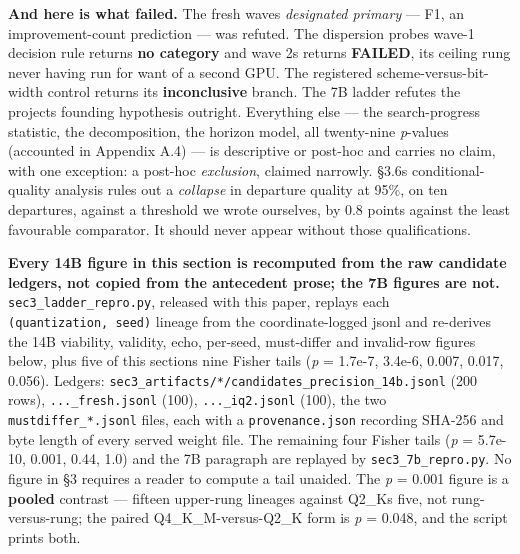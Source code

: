 \textbf{And here is what failed.} The fresh wave\textquotesingle s \emph{designated primary} --- F1, an improvement-count prediction --- was refuted. The dispersion probe\textquotesingle s wave-1 decision rule returns \textbf{no category} and wave 2\textquotesingle s returns \textbf{FAILED}, its ceiling rung never having run for want of a second GPU. The registered scheme-versus-bit-width control returns its \textbf{inconclusive} branch. The 7B ladder refutes the project\textquotesingle s founding hypothesis outright. Everything else --- the search-progress statistic, the decomposition, the horizon model, all twenty-nine \emph{p}-values (accounted in Appendix A.4) --- is descriptive or post-hoc and carries no claim, with one exception: a post-hoc \emph{exclusion}, claimed narrowly. §3.6\textquotesingle s conditional-quality analysis rules out a \emph{collapse} in departure quality at 95\%, on ten departures, against a threshold we wrote ourselves, by 0.8 points against the least favourable comparator. It should never appear without those qualifications.

\textbf{Every 14B figure in this section is recomputed from the raw candidate ledgers, not copied from the antecedent prose; the 7B figures are not.} \texttt{sec3\_ladder\_repro.py}, released with this paper, replays each \texttt{(quantization,\ seed)} lineage from the coordinate-logged jsonl and re-derives the 14B viability, validity, echo, per-seed, must-differ and invalid-row figures below, plus five of this section\textquotesingle s nine Fisher tails (\emph{p} = 1.7e-7, 3.4e-6, 0.007, 0.017, 0.056). Ledgers: \texttt{sec3\_\allowbreak artifacts/\allowbreak **/\allowbreak candidates\_\allowbreak precision\_\allowbreak 14b.jsonl} (200 rows), \texttt{...\_fresh.jsonl} (100), \texttt{...\_iq2.jsonl} (100), the two \texttt{mustdiffer\_*.jsonl} files, each with a \texttt{provenance.json} recording SHA-256 and byte length of every served weight file. The remaining four Fisher tails (\emph{p} = 5.7e-10, 0.001, 0.44, 1.0) and the 7B paragraph are replayed by \texttt{sec3\_7b\_repro.py}. No figure in §3 requires a reader to compute a tail unaided. The \emph{p} = 0.001 figure is a \textbf{pooled} contrast --- fifteen upper-rung lineages against Q2\_K\textquotesingle s five, not rung-versus-rung; the paired Q4\_K\_M-versus-Q2\_K form is \emph{p} = 0.048, and the script prints both.


